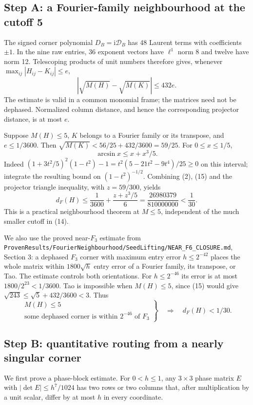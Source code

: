 \documentclass[11pt]{article}
\newcommand{\ii}{\mathrm i}
\begin{document}
\subsection*{Step A: a Fourier-family neighbourhood at the cutoff 5}
The signed corner polynomial $D_B=\ii\mathcal D_B$ has 48 Laurent terms
with coefficients $\pm1$. In the nine raw entries, 36 exponent vectors
have $\ell^1$ norm 8 and twelve have norm 12. Telescoping products of
unit numbers therefore gives, whenever $\max_{ij}|H_{ij}-K_{ij}|\le e$,
\[
 |\sqrt{M(H)}-\sqrt{M(K)}|\le432e.\tag{15}
\]
The estimate is valid in a common monomial frame; the matrices need not
be dephased. Normalized column distance, and hence the corresponding
projector distance, is at most $e$.

Suppose $M(H)\le5$, $K$ belongs to a Fourier family or its transpose,
and $e\le1/3600$. Then $\sqrt{M(K)}<56/25+432/3600=59/25$.
For $0\le x\le1/5$,
\[
 \arcsin x\le x+x^3/5.
\]
Indeed $(1+3t^2/5)^2(1-t^2)-1
=t^2(5-21t^2-9t^4)/25\ge0$ on this interval; integrate the resulting
bound on $(1-t^2)^{-1/2}$. Combining (2), (15) and the projector triangle
inequality, with $z=59/300$, yields
\[
 d_F(H)\le\frac1{3600}+\frac{z+z^3/5}{6}
 =\frac{26980379}{810000000}<\frac1{30}.\tag{16}
\]
This is a practical neighbourhood theorem at $M\le5$, independent of
the much smaller cutoff in (14).

We also use the proved near-$F_3$ estimate from
\texttt{ProvenResults/FourierNeighbourhood/SeedLifting/NEAR\_F6\_CLOSURE.md},
Section 3: a dephased $F_3$ corner with maximum entry error $h\le2^{-42}$
places the whole matrix within $1800\sqrt h$ entry error of a Fourier
family, its transpose, or Tao. The estimate controls both orientations.
For $h\le2^{-46}$ its error is at most $1800/2^{23}<1/3600$.
Tao is impossible when $M(H)\le5$, since (15) would give
$\sqrt{243}\le\sqrt5+432/3600<3$.
Thus
\[
 \left.\begin{array}{c}M(H)\le5\\
 \text{some dephased corner is within }2^{-46}\text{ of }F_3
 \end{array}\right\}\quad\Longrightarrow\quad d_F(H)<1/30.
 \tag{17}
\]

\subsection*{Step B: quantitative routing from a nearly singular corner}
We first prove a phase-block estimate. For $0<h\le1$, any $3\times3$
phase matrix $E$ with $|\det E|\le h^7/1024$ has two rows or two columns
that, after multiplication by a unit scalar, differ by at most $h$ in
every coordinate.
\end{document}
